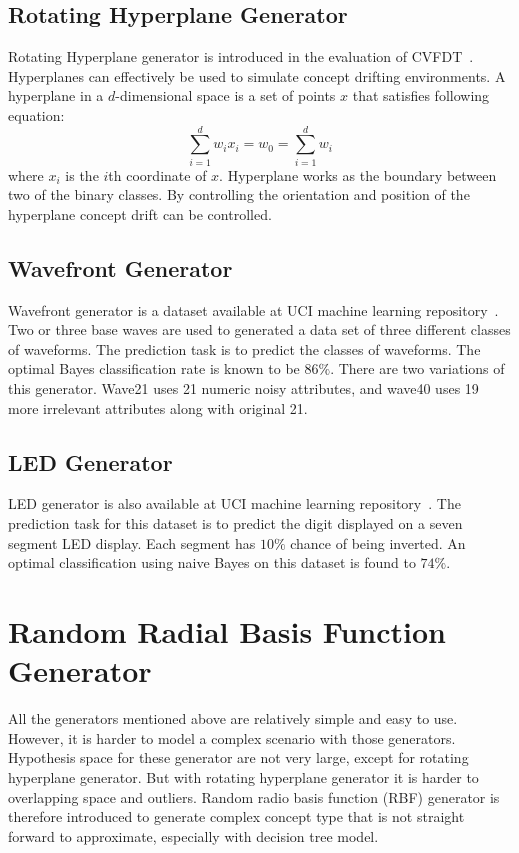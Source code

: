 \subsection{Rotating Hyperplane Generator}
Rotating Hyperplane generator is introduced in the evaluation of CVFDT~\cite{hulten01:cvfdt}. Hyperplanes can effectively be used to simulate concept drifting environments. A hyperplane in a $d$-dimensional space is a set of points $x$ that satisfies following equation:
\[
    \sum_{i=1}^{d} w_i x_i = w_0 = \sum_{i=1}^{d} w_i
\]
where $x_i$ is the $i$th coordinate of $x$. Hyperplane works as the boundary between two of the binary classes. By controlling the orientation and position of the hyperplane concept drift can be controlled. 

\subsection{Wavefront Generator}
Wavefront generator is a dataset available at UCI machine learning repository~\cite{internet:ucirepo}. Two or three base waves are used to generated a data set of three different classes of waveforms. The prediction task is to predict the classes of waveforms. The optimal Bayes classification rate is known to be $86\%$. There are two variations of this generator. Wave21 uses 21 numeric noisy attributes, and wave40 uses 19 more irrelevant attributes along with original 21.

\subsection{LED Generator}
LED generator is also available at UCI machine learning repository~\cite{internet:ucirepo}. The prediction task for this dataset is to predict the digit displayed on a seven segment LED display. Each segment has $10\%$ chance of being inverted. An optimal classification using naive Bayes on this dataset is found to $74\%$. 

\section{Random Radial Basis Function Generator}
All the generators mentioned above are relatively simple and easy to use. However, it is harder to model a complex scenario with those generators. Hypothesis space for these generator are not very large, except for rotating hyperplane generator. But with rotating hyperplane generator it is harder to overlapping space and outliers. Random radio basis function (RBF) generator is therefore introduced to generate complex concept type that is not straight forward to approximate, especially with decision tree model.

